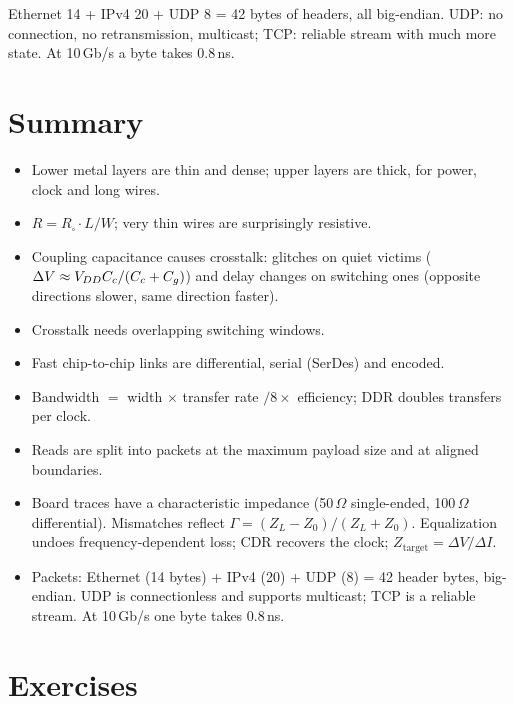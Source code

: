\begin{remember}
Ethernet 14 + IPv4 20 + UDP 8 = 42 bytes of headers, all big-endian. UDP: no connection, no retransmission, multicast; TCP: reliable stream with much more state. At 10\,Gb/s a byte takes 0.8\,ns.
\end{remember}

\section{Summary}

\begin{itemize}
  \item Lower metal layers are thin and dense; upper layers are thick, for power, clock and long wires.
  \item $R = R_\square \cdot L/W$; very thin wires are surprisingly resistive.
  \item Coupling capacitance causes crosstalk: glitches on quiet victims ($\Delta V \approx V_{DD} C_c/(C_c+C_g)$) and delay changes on switching ones (opposite directions slower, same direction faster).
  \item Crosstalk needs overlapping switching windows.
  \item Fast chip-to-chip links are differential, serial (SerDes) and encoded.
  \item Bandwidth $=$ width $\times$ transfer rate $/ 8 \times$ efficiency; DDR doubles transfers per clock.
  \item Reads are split into packets at the maximum payload size and at aligned boundaries.
  \item Board traces have a characteristic impedance (50\,$\Omega$ single-ended, 100\,$\Omega$ differential). Mismatches reflect $\Gamma = (Z_L - Z_0)/(Z_L + Z_0)$. Equalization undoes frequency-dependent loss; CDR recovers the clock; $Z_{\text{target}} = \Delta V/\Delta I$.
  \item Packets: Ethernet (14 bytes) + IPv4 (20) + UDP (8) = 42 header bytes, big-endian. UDP is connectionless and supports multicast; TCP is a reliable stream. At 10\,Gb/s one byte takes 0.8\,ns.
\end{itemize}

\section{Exercises}

